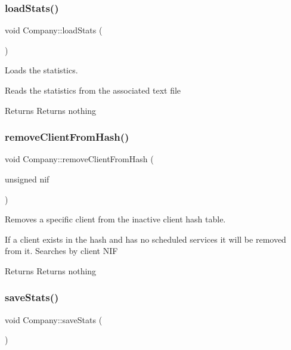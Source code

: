 \subsubsection{\texorpdfstring{load\+Stats()}{loadStats()}}
{\footnotesize\ttfamily void Company\+::load\+Stats (\begin{DoxyParamCaption}{ }\end{DoxyParamCaption})}



Loads the statistics. 

Reads the statistics from the associated text file

\begin{DoxyReturn}{Returns}
Returns nothing 
\end{DoxyReturn}
\mbox{\label{class_company_a3bf95c042bb55a3096871ac861f58f8f}} 
\subsubsection{\texorpdfstring{remove\+Client\+From\+Hash()}{removeClientFromHash()}}
{\footnotesize\ttfamily void Company\+::remove\+Client\+From\+Hash (\begin{DoxyParamCaption}\item[{unsigned}]{nif }\end{DoxyParamCaption})}



Removes a specific client from the inactive client hash table. 

If a client exists in the hash and has no scheduled services it will be removed from it. Searches by client N\+IF

\begin{DoxyReturn}{Returns}
Returns nothing 
\end{DoxyReturn}
\mbox{\label{class_company_aa5b12f509c71984f7346b14cff38ea50}} 
\subsubsection{\texorpdfstring{save\+Stats()}{saveStats()}}
{\footnotesize\ttfamily void Company\+::save\+Stats (\begin{DoxyParamCaption}{ }\end{DoxyParamCaption})}




